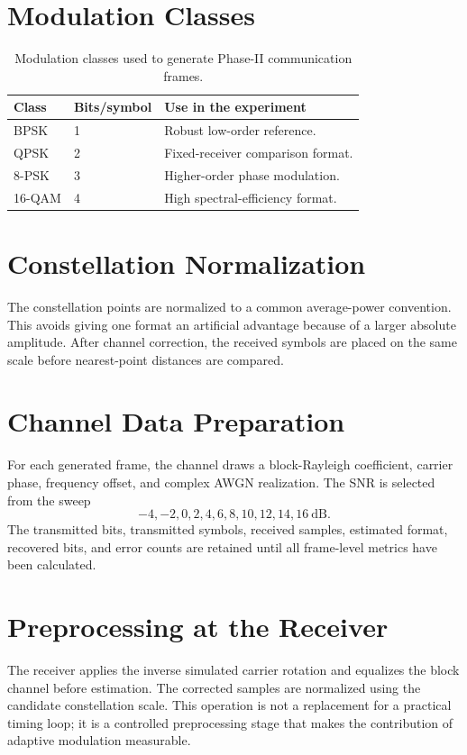 \documentclass[12pt,twoside,openright]{report}
\begin{document}
\section{Modulation Classes}
\begin{table}[htbp]
\centering
\small
\caption{Modulation classes used to generate Phase-II communication frames.}
\label{tab:phase2classes}
\begin{tabular}{p{} p{} p{}}
\toprule
\textbf{Class} & \textbf{Bits/symbol} & \textbf{Use in the experiment}\\
\midrule
BPSK & 1 & Robust low-order reference.\\
QPSK & 2 & Fixed-receiver comparison format.\\
8-PSK & 3 & Higher-order phase modulation.\\
16-QAM & 4 & High spectral-efficiency format.\\
\bottomrule
\end{tabular}
\end{table}

\section{Constellation Normalization}
The constellation points are normalized to a common average-power
convention. This avoids giving one format an artificial advantage because
of a larger absolute amplitude. After channel correction, the received
symbols are placed on the same scale before nearest-point distances are
compared.

\section{Channel Data Preparation}
For each generated frame, the channel draws a block-Rayleigh coefficient,
carrier phase, frequency offset, and complex AWGN realization. The SNR is
selected from the sweep
\[
-4,-2,0,2,4,6,8,10,12,14,16\ \mathrm{dB}.
\]
The transmitted bits, transmitted symbols, received samples, estimated
format, recovered bits, and error counts are retained until all frame-level
metrics have been calculated.

\section{Preprocessing at the Receiver}
The receiver applies the inverse simulated carrier rotation and equalizes
the block channel before estimation. The corrected samples are normalized
using the candidate constellation scale. This operation is not a
replacement for a practical timing loop; it is a controlled preprocessing
stage that makes the contribution of adaptive modulation measurable.
\end{document}
